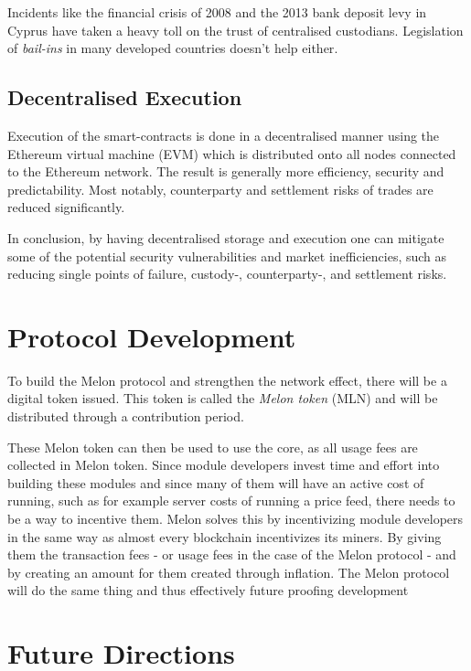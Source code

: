 \documentclass[9pt,oneside]{amsart}
\theoremstyle{plain}
\begin{document}
\begin{multicols}{2}
Incidents like the financial crisis of 2008 and the 2013 bank deposit levy in Cyprus have taken a heavy toll on the trust of centralised custodians. Legislation of \textit{bail-ins} in many developed countries doesn't help either\cite{bailinsch}\cite{bailinseu}.

\subsection{Decentralised Execution}

Execution of the smart-contracts is done in a decentralised manner using the Ethereum virtual machine (EVM) which is distributed onto all nodes connected to the Ethereum network. The result is generally more efficiency, security and predictability. Most notably, counterparty and settlement risks of trades are reduced significantly.

In conclusion, by having decentralised storage and execution one can mitigate some of the potential security vulnerabilities and market inefficiencies, such as reducing single points of failure, custody-, counterparty-, and settlement risks.

\section{Protocol Development}\label{sec:protocoldevelopment}

To build the Melon protocol and strengthen the network effect, there will be a digital token issued. This token is called the \textit{Melon token} (MLN) and will be distributed through a contribution period.

These Melon token can then be used to use the core, as all usage fees are collected in Melon token. Since module developers invest time and effort into building these modules and since many of them will have an active cost of running, such as for example server costs of running a price feed, there needs to be a way to incentive them. Melon solves this by incentivizing module developers in the same way as almost every blockchain incentivizes its miners. By giving them the transaction fees - or usage fees in the case of the Melon protocol - and by creating an amount for them created through inflation. The Melon protocol will do the same thing and thus effectively future proofing development

\section{Future Directions}\label{sec:futuredirections}


\end{multicols}
\end{document}

